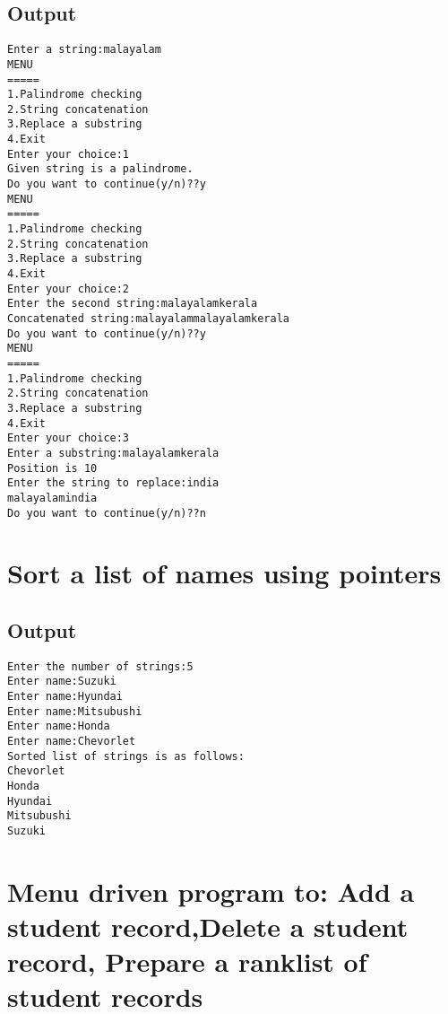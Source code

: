 \documentclass[pdftex,12pt,a4paper]{report}
\begin{document}
\subsection*{Output}
\begin{lstlisting}
Enter a string:malayalam 
MENU
=====
1.Palindrome checking
2.String concatenation
3.Replace a substring
4.Exit
Enter your choice:1
Given string is a palindrome.
Do you want to continue(y/n)??y
MENU
=====
1.Palindrome checking
2.String concatenation
3.Replace a substring
4.Exit
Enter your choice:2
Enter the second string:malayalamkerala
Concatenated string:malayalammalayalamkerala
Do you want to continue(y/n)??y
MENU
=====
1.Palindrome checking
2.String concatenation
3.Replace a substring
4.Exit
Enter your choice:3
Enter a substring:malayalamkerala
Position is 10
Enter the string to replace:india
malayalamindia
Do you want to continue(y/n)??n

\end{lstlisting}

\newpage
\section*{Sort a list of names using pointers}

\subsection*{Output}
\begin{lstlisting}
Enter the number of strings:5
Enter name:Suzuki
Enter name:Hyundai
Enter name:Mitsubushi
Enter name:Honda
Enter name:Chevorlet
Sorted list of strings is as follows:
Chevorlet
Honda
Hyundai
Mitsubushi
Suzuki
\end{lstlisting}

\newpage
\section*{Menu driven program to: Add a student record,Delete a student record, Prepare a ranklist of student records}

\end{document}
